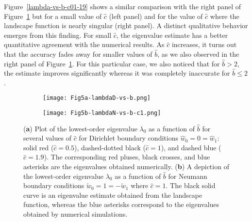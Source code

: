 \documentclass[symmetry,article,accept,moreauthors,pdftex,a4paper]{mdpi}
\begin{document}
\begin{paracol}{2}
Figure~\ref{lambda-vs-b-c01-19} shows a similar comparison with the right panel of Figure~\ref{lambda-vs-b-c1} but for a small value of $\widehat{c}$ (left panel) and for the value of $\widehat{c}$ where the landscape function is nearly singular (right panel). A distinct qualitative behavior emerges from this finding. For small $\widehat{c}$, the eigenvalue estimate has a better quantitative agreement with the numerical results. As $\widehat{c}$ increases, it turns out that the accuracy fades away for smaller values of $\widehat{b}$, as we also observed in the right panel of Figure~\ref{lambda-vs-b-c1}. For this particular case, we also noticed that for $\widehat{b} > 2$, the estimate improves significantly whereas it was completely inaccurate for $\widehat{b} \leq 2$.

\end{paracol}
\nointerlineskip
\begin{figure}[H]
\widefigure
\begin{subfigure}{0.45\textwidth}
\caption{} \vspace{0.1cm}
\texttt{[image: Fig5a-lambdaD-vs-b.png]}
\end{subfigure}	\hspace*{0.5cm}
\begin{subfigure}{0.45\textwidth}
\caption{} \vspace{0.1cm}
\texttt{[image: Fig5b-lambdaN-vs-b-c1.png]}
\end{subfigure}
\caption{(\textbf{a}) Plot of the lowest-order eigenvalue $\lambda_0$ as a function of $\widehat{b}$ for several values of $\widehat{c}$ for Dirichlet boundary conditions $\widehat{w}_0 = 0 = \widehat{w}_1$: solid red ($\widehat{c} = 0.5$), dashed-dotted black ($\widehat{c} = 1$), and dashed blue ($\widehat{c} = 1.9$). The corresponding red pluses, black crosses, and blue asterisks are the eigenvalues obtained numerically. (\textbf{b}) A depiction of the lowest-order eigenvalue $\lambda_0$ as a function of $\widehat{b}$ for Neumann boundary conditions $\widetilde{w}_0 = 1 = -\widetilde{w}_1$ where $\widehat{c} = 1$. The black solid curve is an eigenvalue estimate obtained from the landscape function, whereas the blue asterisks correspond to the eigenvalues obtained by numerical simulations.}		\label{lambda-vs-b-c1}
\end{figure}
\end{document}
